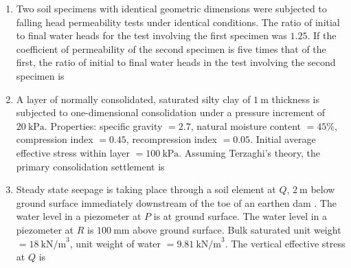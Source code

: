 \documentclass[journal]{IEEEtran}
\begin{document}
\begin{enumerate}
\item Two soil specimens with identical geometric dimensions were subjected to falling head permeability tests under identical conditions. The ratio of initial to final water heads for the test involving the first specimen was $1.25$. If the coefficient of permeability of the second specimen is five times that of the first, the ratio of initial to final water heads in the test involving the second specimen is \hfill {}
\begin{enumerate}
\end{enumerate}

\item A layer of normally consolidated, saturated silty clay of $1\ \text{m}$ thickness is subjected to one-dimensional consolidation under a pressure increment of $20\ \text{kPa}$. Properties: specific gravity $=2.7$, natural moisture content $=45\%$, compression index $=0.45$, recompression index $=0.05$. Initial average effective stress within layer $=100\ \text{kPa}$. Assuming Terzaghi's theory, the primary consolidation settlement  is \hfill {}
\begin{enumerate}
\end{enumerate}

\item Steady state seepage is taking place through a soil element at $Q$, $2\ \text{m}$ below ground surface immediately downstream of the toe of an earthen dam . The water level in a piezometer at $P$  is at ground surface. The water level in a piezometer at $R$  is $100\ \text{mm}$ above ground surface. Bulk saturated unit weight $=18\ \text{kN/m}^3$, unit weight of water $=9.81\ \text{kN/m}^3$. The vertical effective stress  at $Q$ is \hfill {}


\end{enumerate}
\end{document}
